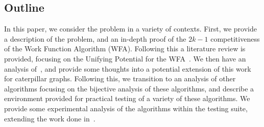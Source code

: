 \subsection{Outline}
\label{sec:out}
In this paper, we consider the \KS problem in a variety of contexts. First, we provide a description of the \KS problem, and an in-depth proof of the $2k-1$ competitiveness of the Work Function Algorithm (WFA). Following this a literature review is provided, focusing on the Unifying Potential for the WFA~\cite{unifyingPotential2021}. We then have an analysis of~\cite{unifyingPotential2021}, and provide some thoughts into a potential extension of this work for caterpillar graphs. Following this, we transition to an analysis of other algorithms focusing on the bijective analysis of these algorithms, and describe a \CC environment provided for practical testing of a variety of these algorithms. We provide some experimental analysis of the algorithms within the testing suite, extending the work done in~\cite{independantStudy2023}.

